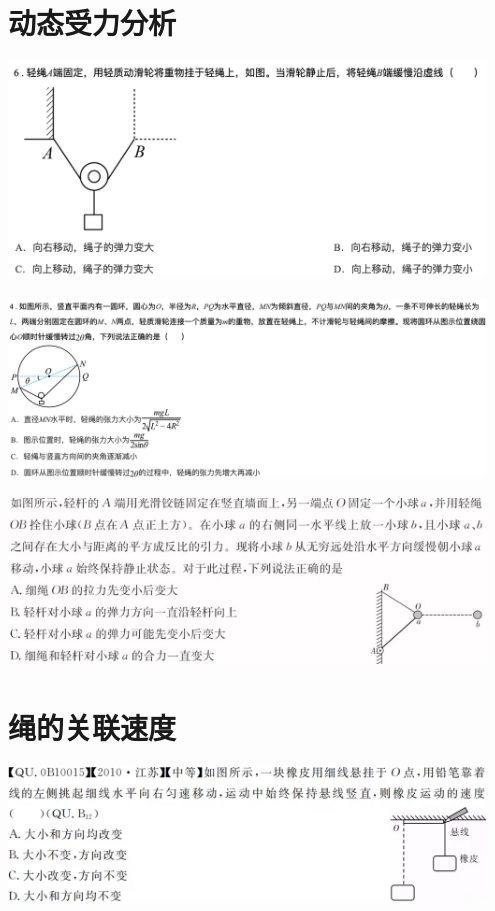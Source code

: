 \documentclass{article}
\begin{document}
\vspace{5em}

\section{动态受力分析}
\includegraphics[width = 0.95\textwidth]{./pictures/10.png}

\vspace{5em}

\includegraphics[width = 0.95\textwidth]{./pictures/11.png}

\vspace{5em}

\includegraphics[width = 0.95\textwidth]{./pictures/12.png}

\vspace{5em}

\section{绳的关联速度}
\includegraphics[width = 0.95\textwidth]{./pictures/13.png}
\end{document}
